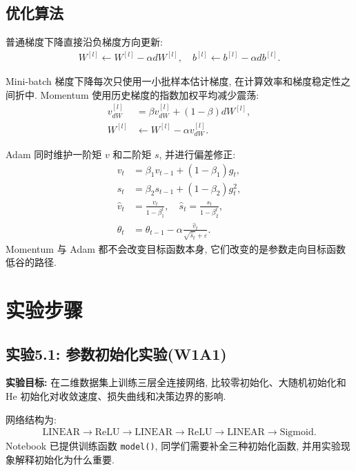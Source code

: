 \documentclass{../../nndlcourse}
\begin{document}
\subsection{优化算法}

普通梯度下降直接沿负梯度方向更新:
\begin{align}
    W^{[l]} \leftarrow W^{[l]}-\alpha dW^{[l]},
    \quad
    b^{[l]} \leftarrow b^{[l]}-\alpha db^{[l]}.
\end{align}

Mini-batch 梯度下降每次只使用一小批样本估计梯度, 在计算效率和梯度稳定性之间折中. Momentum 使用历史梯度的指数加权平均减少震荡:
\begin{align}
    v_{dW}^{[l]} &= \beta v_{dW}^{[l]} + (1-\beta)dW^{[l]},\\
    W^{[l]} &\leftarrow W^{[l]}-\alpha v_{dW}^{[l]}.
\end{align}

Adam 同时维护一阶矩 $v$ 和二阶矩 $s$, 并进行偏差修正:
\begin{align}
    v_t &= \beta_1 v_{t-1}+(1-\beta_1)g_t,\\
    s_t &= \beta_2 s_{t-1}+(1-\beta_2)g_t^2,\\
    \hat{v}_t &= \frac{v_t}{1-\beta_1^t},
    \quad
    \hat{s}_t = \frac{s_t}{1-\beta_2^t},\\
    \theta_t &= \theta_{t-1}
    - \alpha\frac{\hat{v}_t}{\sqrt{\hat{s}_t}+\varepsilon}.
\end{align}
Momentum 与 Adam 都不会改变目标函数本身, 它们改变的是参数走向目标函数低谷的路径.


\section{实验步骤}

\subsection*{实验5.1: 参数初始化实验(W1A1)}

\textbf{实验目标: }在二维数据集上训练三层全连接网络, 比较零初始化、大随机初始化和 He 初始化对收敛速度、损失曲线和决策边界的影响.

网络结构为:
\begin{align}
    \mathrm{LINEAR}\to\mathrm{ReLU}\to
    \mathrm{LINEAR}\to\mathrm{ReLU}\to
    \mathrm{LINEAR}\to\mathrm{Sigmoid}.
\end{align}
Notebook 已提供训练函数 \texttt{model()}, 同学们需要补全三种初始化函数, 并用实验现象解释初始化为什么重要.
\end{document}
